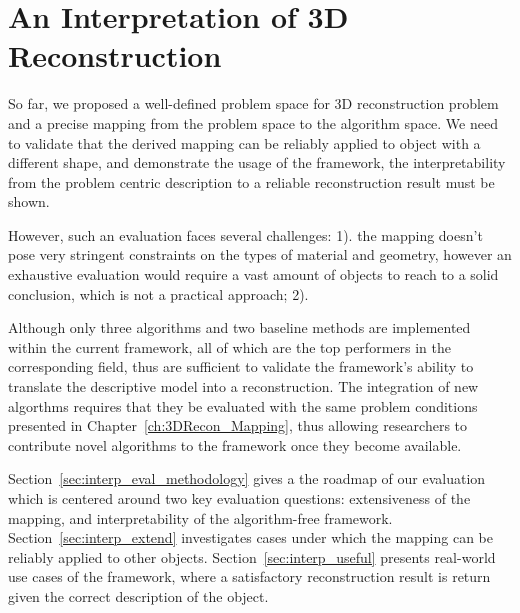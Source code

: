 
\chapter{An Interpretation of 3D Reconstruction}
\label{ch:3DRecon_Interp}
So far, we proposed a well-defined problem space for 3D reconstruction problem and a precise mapping from the problem space to the algorithm space. We need to validate that the derived mapping can be reliably applied to object with a different shape, and demonstrate the usage of the framework, \ie the interpretability from the problem centric description to a reliable reconstruction result must be shown.

However, such an evaluation faces several challenges: 1). the mapping doesn't pose very stringent constraints on the types of material and geometry, however an exhaustive evaluation would require a vast amount of objects to reach to a solid conclusion, which is not a practical approach; 2). 


Although only three algorithms and two baseline methods are implemented within the current framework, all of which are the top performers in the corresponding field, thus are sufficient to validate the framework's ability to translate the descriptive model into a reconstruction. The integration of new algorthms requires that they be evaluated with the same problem conditions presented in Chapter~\ref{ch:3DRecon_Mapping}, thus allowing researchers to contribute novel algorithms to the framework once they become available.

Section~\ref{sec:interp_eval_methodology} gives a the roadmap of our evaluation which is centered around two key evaluation questions: extensiveness of the mapping, and interpretability of the algorithm-free framework. Section~\ref{sec:interp_extend} investigates cases under which the mapping can be reliably applied to other objects. Section~\ref{sec:interp_useful} presents real-world use cases of the framework, where a satisfactory reconstruction result is return given the correct description of the object.

